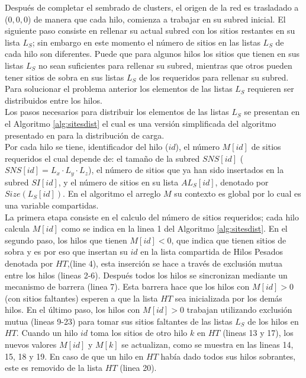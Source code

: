 Después de completar el sembrado de clusters, el origen de la red es trasladado a ($0, 0, 0$) de manera que cada hilo, comienza a trabajar en su subred inicial. El siguiente paso consiste en rellenar su actual subred con los sitios restantes en su lista $L_S$; sin embargo en este momento el número de sitios en las listas $L_S$ de cada hilo son diferentes. Puede que para algunos hilos los sitios que tienen en sus listas $L_S$ no sean suficientes para rellenar su subred, mientras que otros pueden tener sitios de sobra en sus listas $L_S$ de los requeridos para rellenar su subred. Para solucionar el problema anterior los elementos de las listas $L_S$   requieren ser distribuidos entre los hilos.\\

Los pasos necesarios para distribuir los elementos de las listas $L_S$ se presentan en el Algoritmo \ref{alg:sitesdist} el cual es una versión simplificada del algoritmo presentado en \cite{ref11} para la distribución de carga.\\

Por cada hilo se tiene, identificador del hilo ($id$), el número $M[id]$ de sitios requeridos el cual depende de: el tamaño de la subred $SNS[id]$ ($SNS[id] = L_x \cdot L_y \cdot L_z$), el número de sitios que ya han sido insertados en la subred $SI[id]$, y el número de sitios en su lista $AL_S[id]$, denotado por $Size(L_S[id])$. En el algoritmo el arreglo $M$ su contexto es global por lo cual es una variable compartidas.\\

La primera etapa consiste en el calculo del número de sitios requeridos; cada hilo calcula $M[id]$ como se indica en la linea 1 del Algoritmo \ref{alg:sitesdist}. En el segundo paso, los hilos que tienen $M[id]<0$, que indica que tienen sitios de sobra y es por eso que insertan su $id$ en la lista compartida de Hilos Pesados denotada por $HT$,(line 4), esta inserción se hace a través de exclusión mutua entre los hilos (lineas 2-6). Después todos los hilos se sincronizan mediante un mecanismo de barrera (linea 7). Esta barrera hace que los hilos con $M[id]>0$ (con sitios faltantes) esperen a que la lista $HT$ sea inicializada por los demás hilos. En el último paso, los hilos con $M[id] > 0$ trabajan utilizando exclusión mutua (lineas 9-23) para tomar sus sitios faltantes de las listas $L_S$ de los hilos en $HT$. Cuando un hilo $id$ toma los sitios de otro hilo $k$ en $HT$ (lineas 13 y 17), los nuevos valores $M[id]$ y $M[k]$ se actualizan, como se muestra en las lineas 14, 15, 18 y 19. En caso de que un hilo en $HT$ había dado todos sus hilos sobrantes, este es removido de la lista $HT$ (linea 20).\\

